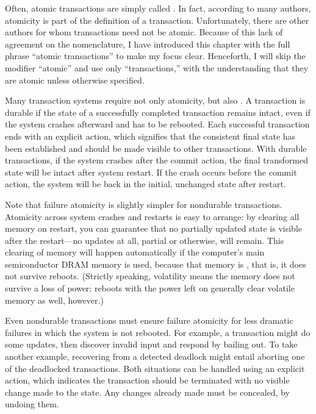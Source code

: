 Often, atomic transactions are simply called .  In
fact, according to many authors, atomicity is part of the definition
of a transaction.  Unfortunately, there are other authors for whom
transactions need not be atomic.  Because of this lack of agreement on
the nomenclature, I have introduced this chapter with the full phrase
``atomic transactions'' to make my focus clear.  Henceforth, I will
skip the modifier ``atomic'' and use only ``transactions,'' with the
understanding that they are atomic unless otherwise specified.

Many transaction systems require not only atomicity, but also
.  A transaction is durable if the
state of a successfully completed transaction remains intact, even if
the system crashes afterward and has to be rebooted.  Each successful
transaction ends with an explicit  action, which
signifies that the consistent final state has been established and
should be made visible to other transactions.  With durable
transactions, if the system crashes after the commit action, the final
transformed state will be intact after system restart.  If the crash
occurs before the commit action, the system will be back in the
initial, unchanged state after restart.

Note that failure atomicity is slightly simpler for nondurable
transactions.  Atomicity across system crashes and restarts is easy to
arrange: by clearing all memory on restart, you can guarantee that no
partially updated state is visible after the restart---no updates at
all, partial or otherwise, will remain.  This clearing of memory will
happen automatically if the computer's main semiconductor DRAM memory
is used, because that memory is , that is, it does not
survive reboots.  (Strictly speaking, volatility means the memory does
not survive a loss of power; reboots with the power left on generally
clear volatile memory as well, however.)

Even nondurable transactions must ensure failure atomicity
for less dramatic failures in which the system is not rebooted.  For
example, a transaction might do some updates, then discover invalid
input and respond by bailing out.
To take another example, recovering from a
detected deadlock might entail aborting one of the deadlocked
transactions.  Both situations can be handled using an
explicit  action, which indicates the transaction should
be terminated with no visible change made to the state.  Any changes
already made must be concealed, by undoing them.

